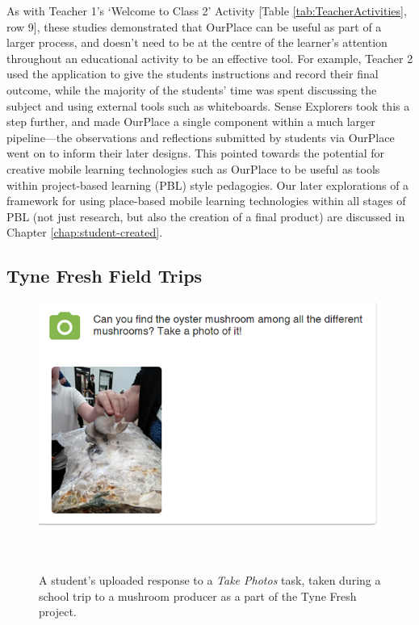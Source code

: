 As with Teacher 1's `Welcome to Class 2' Activity [Table \ref{tab:TeacherActivities}, row 9], these studies demonstrated that OurPlace can be useful as part of a larger process, and doesn't need to be at the centre of the learner's attention throughout an educational activity to be an effective tool. For example, Teacher 2 used the application to give the students instructions and record their final outcome, while the majority of the students' time was spent discussing the subject and using external tools such as whiteboards. Sense Explorers took this a step further, and made OurPlace a single component within a much larger pipeline---the observations and reflections submitted by students via OurPlace went on to inform their later designs. This pointed towards the potential for creative mobile learning technologies such as OurPlace to be useful as tools within project-based learning (PBL) style pedagogies. Our later explorations of a framework for using place-based mobile learning technologies within all stages of PBL (not just research, but also the creation of a final product) are discussed in Chapter \ref{chap:student-created}.

\subsection{Tyne Fresh Field Trips}
\label{sec:TyneFresh}

\begin{figure}
  \centering
  \includegraphics[width=0.8\columnwidth]{images/chapter07/mushroom.png}
  \caption[A student's uploaded photo from a visit to a mushroom producer]{A student's uploaded response to a \textit{Take Photos} task, taken during a school trip to a mushroom producer as a part of the Tyne Fresh project.}~\label{fig:MushroomTrip}
\end{figure}

